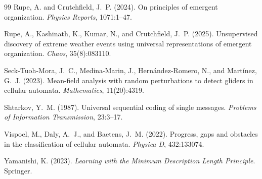 \documentclass[letterpaper]{article}
\begin{document}
\begin{thebibliography}{99}
Rupe, A. and Crutchfield, J.~P. (2024).
On principles of emergent organization.
\emph{Physics Reports}, 1071:1--47.

Rupe, A., Kashinath, K., Kumar, N., and Crutchfield, J.~P. (2025).
Unsupervised discovery of extreme weather events using universal
representations of emergent organization.
\emph{Chaos}, 35(8):083110.

Seck-Tuoh-Mora, J.~C., Medina-Marin, J., Hern{\'a}ndez-Romero, N., and Mart{\'i}nez, G.~J. (2023).
Mean-field analysis with random perturbations to detect gliders in cellular automata.
\emph{Mathematics}, 11(20):4319.

Shtarkov, Y.~M. (1987).
Universal sequential coding of single messages.
\emph{Problems of Information Transmission}, 23:3--17.

Vispoel, M., Daly, A.~J., and Baetens, J.~M. (2022).
Progress, gaps and obstacles in the classification of cellular automata.
\emph{Physica D}, 432:133074.

Yamanishi, K. (2023).
\emph{Learning with the Minimum Description Length Principle}. Springer.

\end{thebibliography}
\end{document}
